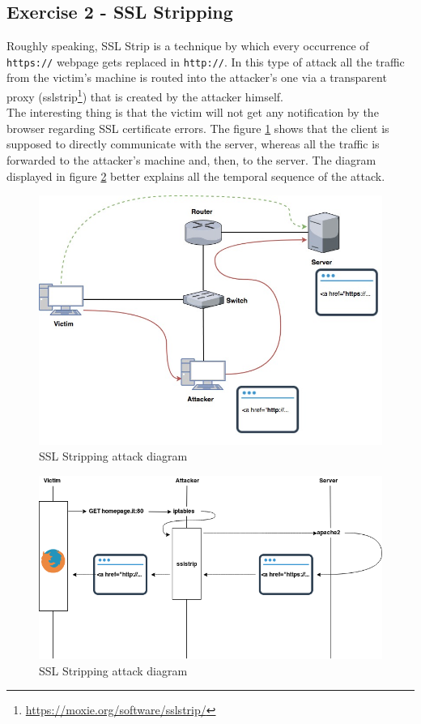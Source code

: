 \documentclass[final]{article}
\begin{document}
\subsection{Exercise 2 - SSL Stripping}
Roughly speaking, SSL Strip is a technique by which every occurrence of \texttt{https://} webpage gets replaced in \texttt{http://}.
In this type of attack all the traffic from the victim’s machine is routed into the attacker's one via a transparent proxy
(sslstrip\footnote{\url{https://moxie.org/software/sslstrip/}}) that is created by the attacker himself. \cite{elks2011man}\\
The interesting thing is that the victim will not get any notification by the browser regarding SSL certificate errors.
The figure \ref{sslstrip} shows that the client is supposed to directly communicate with the server,
whereas all the traffic is forwarded to the attacker's machine and, then, to the server.
The diagram displayed in figure \ref{sslstrip_time} better explains all the temporal sequence of the attack.\\
\begin{figure}[h]
  \center
  \includegraphics[width=\textwidth]{../figures/sslstrip}
  \caption{SSL Stripping attack diagram}
  \label{sslstrip}
\end{figure}
\begin{figure}[h]
  \center
  \includegraphics[width=\textwidth]{../figures/sslstrip_time}
  \caption{SSL Stripping attack diagram}
  \label{sslstrip_time}
\end{figure}
\end{document}
